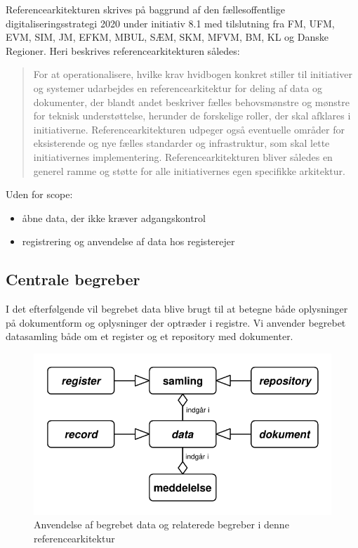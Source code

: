 Referencearkitekturen skrives på baggrund af den fællesoffentlige
digitaliseringsstrategi 2020 under initiativ 8.1 med tilslutning fra FM,
UFM, EVM, SIM, JM, EFKM, MBUL, SÆM, SKM, MFVM, BM, KL og Danske
Regioner. Heri beskrives referencearkitekturen således:

\begin{quote}
For at operationalisere, hvilke krav hvidbogen konkret stiller til
initiativer og systemer udarbejdes en referencearkitektur for deling af
data og dokumenter, der blandt andet beskriver fælles behovsmønstre og
mønstre for teknisk understøttelse, herunder de forskelige roller, der
skal afklares i initiativerne. Referencearkitekturen udpeger også
eventuelle områder for eksisterende og nye fælles standarder og
infrastruktur, som skal lette initiativernes implementering.
Referencearkitekturen bliver således en generel ramme og støtte for alle
initiativernes egen specifikke arkitektur.
\end{quote}

Uden for scope:

\begin{itemize}
\tightlist
\item
  åbne data, der ikke kræver adgangskontrol
\item
  registrering og anvendelse af data hos registerejer
\end{itemize}

\subsection{Centrale begreber}\label{centrale-begreber}

I det efterfølgende vil begrebet data blive brugt til at betegne både
oplysninger på dokumentform og oplysninger der optræder i registre. Vi
anvender begrebet datasamling både om et register og et repository med
dokumenter.

\begin{figure}
\centering
\includegraphics{abstraktion.pdf}
\caption{Anvendelse af begrebet data og relaterede begreber i denne
referencearkitektur}
\end{figure}

